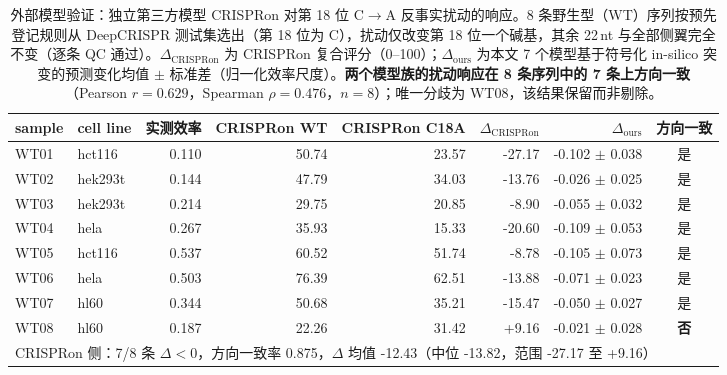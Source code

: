 \begin{table}[htbp]
\centering
\footnotesize
\caption{外部模型验证：独立第三方模型 CRISPRon 对第 18 位 C$\rightarrow$A 反事实扰动的响应。8 条野生型（WT）序列按预先登记规则从 DeepCRISPR 测试集选出（第 18 位为 C），扰动仅改变第 18 位一个碱基，其余 22\,nt 与全部侧翼完全不变（逐条 QC 通过）。$\Delta_{\text{CRISPRon}}$ 为 CRISPRon 复合评分（0--100）；$\Delta_{\text{ours}}$ 为本文 7 个模型基于符号化 in-silico 突变的预测变化均值 $\pm$ 标准差（归一化效率尺度）。\textbf{两个模型族的扰动响应在 8 条序列中的 7 条上方向一致}（Pearson $r=0.629$，Spearman $\rho=0.476$，$n=8$）；唯一分歧为 WT08，该结果保留而非剔除。}
\label{tab:externalvalidation}
\begin{tabular}{llrrrrrc}
\toprule
sample & cell line & 实测效率 & CRISPRon WT & CRISPRon C18A & $\Delta_{\text{CRISPRon}}$ & $\Delta_{\text{ours}}$ & 方向一致 \\
\midrule
WT01 & hct116 & 0.110 & 50.74 & 23.57 & -27.17 & -0.102 $\pm$ 0.038 & 是 \\
WT02 & hek293t & 0.144 & 47.79 & 34.03 & -13.76 & -0.026 $\pm$ 0.025 & 是 \\
WT03 & hek293t & 0.214 & 29.75 & 20.85 & -8.90 & -0.055 $\pm$ 0.032 & 是 \\
WT04 & hela & 0.267 & 35.93 & 15.33 & -20.60 & -0.109 $\pm$ 0.053 & 是 \\
WT05 & hct116 & 0.537 & 60.52 & 51.74 & -8.78 & -0.105 $\pm$ 0.073 & 是 \\
WT06 & hela & 0.503 & 76.39 & 62.51 & -13.88 & -0.071 $\pm$ 0.023 & 是 \\
WT07 & hl60 & 0.344 & 50.68 & 35.21 & -15.47 & -0.050 $\pm$ 0.027 & 是 \\
WT08 & hl60 & 0.187 & 22.26 & 31.42 & +9.16 & -0.021 $\pm$ 0.028 & \textbf{否} \\
\midrule
\multicolumn{8}{l}{CRISPRon 侧：7/8 条 $\Delta<0$，方向一致率 0.875，$\Delta$ 均值 -12.43（中位 -13.82，范围 -27.17 至 +9.16）} \\
\bottomrule
\end{tabular}
\end{table}
